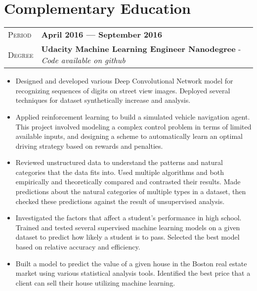 \documentclass[10pt, a4paper, oneside, final]{scrartcl} %
\newcommand{\gray}{\rowcolor[gray]{.90}} %
\begin{document}

\section{Complementary Education}

\begin{center}
\begin{tabularx}{1.0\linewidth}{>{\raggedleft\scshape}p{2.34cm}X}
\gray Period & \textbf{April 2016 --- September 2016}\\
\gray Degree & \textbf{Udacity Machine Learning Engineer Nanodegree} - \textit{Code available on github}\\
\end{tabularx}
\end{center}

\begin{itemize}\itemsep1.5pt
\item Designed and developed various Deep Convolutional Network model for recognizing sequences of digits on street view images. Deployed several techniques for dataset synthetically increase and analysis. 

\item Applied reinforcement learning to build a simulated vehicle navigation agent. This project involved modeling a complex control problem in terms of limited available inputs, and designing a scheme to automatically learn an optimal driving strategy based on rewards and penalties.

\item Reviewed unstructured data to understand the patterns and natural categories that the data fits into. Used multiple algorithms and both empirically and theoretically compared and contrasted their results. Made predictions about the natural categories of multiple types in a dataset, then checked these predictions against the result of unsupervised analysis.

\item Investigated the factors that affect a student's performance in high school. Trained and tested several supervised machine learning models on a given dataset to predict how likely a student is to pass. Selected the best model based on relative accuracy and efficiency.

\item Built a model to predict the value of a given house in the Boston real estate market using various statistical analysis tools. Identified the best price that a client can sell their house utilizing machine learning.

\end{itemize}
\end{document}
